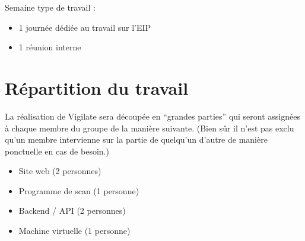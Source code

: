 Semaine type de travail :\\
\begin{itemize}
\item 1 journée dédiée au travail sur l’EIP\\
\item 1 réunion interne\\
\end{itemize}

\section{Répartition du travail}
La réalisation de Vigilate sera découpée en “grandes parties” qui seront assignées à chaque membre du groupe de la manière suivante. (Bien sûr il n’est pas exclu qu’un membre intervienne sur la partie de quelqu’un d’autre de manière ponctuelle en cas de besoin.)\\
\begin{itemize}
\item Site web (2 personnes)\\
\item Programme de scan (1 personne)\\
\item Backend / API (2 personnes)\\
\item Machine virtuelle (1 personne)\\
\end{itemize}
